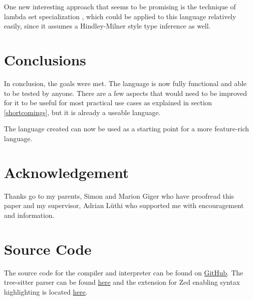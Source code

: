 \documentclass[12pt]{article}
\begin{document}
One new interesting approach that seems to be promising
is the technique of lambda set specialization
\autocite{brandonBetterDefunctionalizationLambda2023a}, which
could be applied to this language relatively easily,
since it assumes a Hindley-Milner style type inference
as well.

\section{Conclusions}
In conclusion, the goals were met.
The language is now fully functional and able to be tested by anyone.
There are a few aspects that would need to be improved for it to be
useful for most practical use cases as explained in section \ref{shortcomings},
but it is already a useable language.

The language created can now be used as a starting point for a more
feature-rich language.

\newpage
\printbibliography
\newpage
\lstlistoflistings
\listoffigures

\newpage
\printglossaries

\appendix

\section{Acknowledgement}
Thanks go to my parents, Simon and Marion Giger who have proofread this paper
and my supervisor, Adrian Lüthi who supported me with encouragement and information.

\section{Source Code}
The source code for the compiler and interpreter can be found on
\href{https://github.com/enmiligi/matura-project}{GitHub}.
The tree-sitter parser can be found \href{https://github.com/enmiligi/tree-sitter-imp}{here}
and the extension for Zed enabling syntax highlighting is located \href{https://github.com/enmiligi/zed-imp}{here}.
\end{document}

